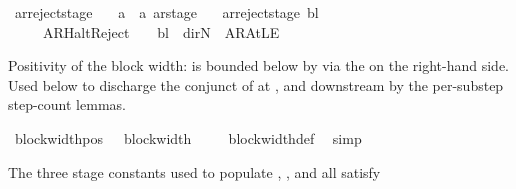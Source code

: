 \begin{isabellebody}
\isanewline
{}\isamarkupfalse%
\ ar{\isacharunderscore}{\kern0pt}reject{\isacharunderscore}{\kern0pt}stage\ {\isacharcolon}{\kern0pt}{\isacharcolon}{\kern0pt}\isanewline
\ \ {\isachardoublequoteopen}{\isacharprime}{\kern0pt}a\ {\isasymRightarrow}\ {\isacharprime}{\kern0pt}a\ ar{\isacharunderscore}{\kern0pt}stage{\isachardoublequoteclose}\ \isanewline
\ \ {\isachardoublequoteopen}ar{\isacharunderscore}{\kern0pt}reject{\isacharunderscore}{\kern0pt}stage\ bl\ {\isacharequal}{\kern0pt}\isanewline
\ \ \ \ \ {\isacharparenleft}{\kern0pt}AR{\isacharunderscore}{\kern0pt}HaltReject{\isacharcomma}{\kern0pt}\ {}{\isacharcomma}{\kern0pt}\ {}{\isacharcomma}{\kern0pt}\ {\isacharparenleft}{\kern0pt}{\isasymlambda}{\isacharunderscore}{\kern0pt}{\isachardot}{\kern0pt}\ bl{\isacharparenright}{\kern0pt}{\isacharcomma}{\kern0pt}\ {\isacharparenleft}{\kern0pt}{\isasymlambda}{\isacharunderscore}{\kern0pt}{\isachardot}{\kern0pt}\ dir{\isachardot}{\kern0pt}N{\isacharparenright}{\kern0pt}{\isacharcomma}{\kern0pt}\ {\isacharparenleft}{\kern0pt}{\isasymlambda}{\isacharunderscore}{\kern0pt}{\isachardot}{\kern0pt}\ AR{\isacharunderscore}{\kern0pt}AtLE{\isacharparenright}{\kern0pt}{\isacharparenright}{\kern0pt}{\isachardoublequoteclose}%
\begin{isamarkuptext}%
Positivity of the block width:  is bounded below
  by  via the  on the right-hand side.  Used
  below to discharge the  conjunct of
   at , and downstream by
  the per-substep step-count lemmas.%
\end{isamarkuptext}\isamarkuptrue%
\isamarkupfalse%
\ block{\isacharunderscore}{\kern0pt}width{\isacharunderscore}{\kern0pt}pos{\isacharcolon}{\kern0pt}\ {\isachardoublequoteopen}{}\ {\isasymle}\ block{\isacharunderscore}{\kern0pt}width\ {\isasymGamma}{\isachardoublequoteclose}\isanewline
%
\isadelimproof
\ \ %
\endisadelimproof
%
\isatagproof
{}\isamarkupfalse%
\ block{\isacharunderscore}{\kern0pt}width{\isacharunderscore}{\kern0pt}def\ \isamarkupfalse%
\ simp%
\endisatagproof
{\isafoldproof}%
%
\isadelimproof
%
\endisadelimproof
%
\begin{isamarkuptext}%
The three stage constants used to populate ,
  , and  all satisfy

\end{isamarkuptext}
\end{isabellebody}
